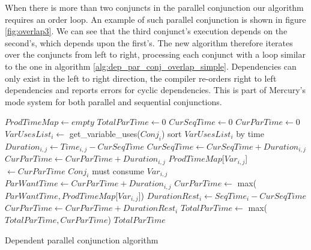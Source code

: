 
When there is more than two conjuncts in the parallel conjunction our
algorithm requires an order loop.
An example of such parallel conjunction is shown in figure
\ref{fig:overlap3}.
We can see that the third conjunct's execution depends on the second's,
which depends upon the first's.
The new algorithm therefore iterates over the conjuncts from left to right,
processing each conjunct with a loop similar to the one in algorithm
\ref{alg:dep_par_conj_overlap_simple}.
Dependencies can only exist in the left to right direction,
the compiler re-orders right to left dependencies and reports errors for
cyclic dependencies.
This is part of Mercury's mode system for both parallel and sequential
conjunctions.


\begin{algorithm}[tb]
\begin{algorithmic}[5]
    \State $ProdTimeMap \gets empty$
    \State $TotalParTime \gets 0$
        \State $CurSeqTime \gets 0$
        \State $CurParTime \gets 0$
        \State $VarUsesList_i \gets$ get\_variable\_uses($Conj_i$)
        \State sort $VarUsesList_i$ by time
            \State $Duration_{i, j} \gets Time_{i, j} - CurSeqTime$
            \State $CurSeqTime \gets CurSeqTime + Duration_{i, j}$
                \State $CurParTime \gets CurParTime + Duration_{i, j}$
                \State $ProdTimeMap$[$Var_{i, j}$]~$ \gets CurParTime$
            \Else
                \Comment $Conj_i$ must consume $Var_{i, j}$
                \State $ParWantTime \gets CurParTime + Duration_{i, j}$
                \State $CurParTime \gets$
                    max($ParWantTime, ProdTimeMap$[$Var_{i, j}$])
            \EndIf
        \EndFor
        \State $DurationRest_i \gets SeqTime_i - CurSeqTime$
        \State $CurParTime \gets CurParTime + DurationRest_i$
        \State $TotalParTime \gets$ max($TotalParTime, CurParTime$)
    \EndFor
    \State \Return $TotalParTime$
\EndProcedure
\end{algorithmic}
\caption{Dependent parallel conjunction algorithm}
\label{alg:dep_par_conj_overlap_middle}
\end{algorithm}

